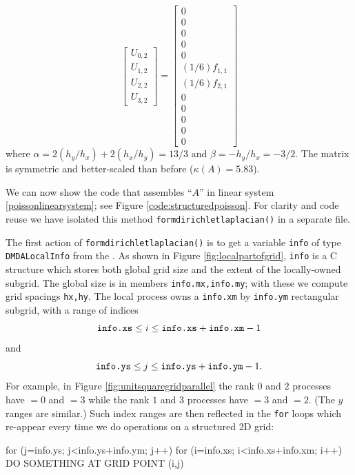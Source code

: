 \begin{example}
\begin{equation*}
\begin{bmatrix}
U_{0,2} \\
U_{1,2} \\
U_{2,2} \\
U_{3,2}
\end{bmatrix}
=
\begin{bmatrix}
0 \\
0 \\
0 \\
0 \\
0 \\
(1/6) f_{1,1} \\
(1/6) f_{2,1} \\
0 \\
0 \\
0 \\
0 \\
0
\end{bmatrix}
\end{equation*}
where $\alpha = 2 (h_y/h_x) + 2 (h_x/h_y) = 13/3$ and $\beta = - h_y/h_x = - 3/2$.  The matrix is symmetric and better-scaled than before ($\kappa(A)=5.83$).
\end{example}
\noindent\hrulefill

We can now show the code that assembles ``$A$'' in linear system \eqref{poissonlinearsystem}; see Figure \ref{code:structuredpoisson}.  For clarity and code reuse we have isolated this method \texttt{formdirichletlaplacian()} in a separate file.


The first action of \texttt{formdirichletlaplacian()} is to get a variable \texttt{info} of type \texttt{DMDALocalInfo} from the \pDM.  As shown in Figure \ref{fig:localpartofgrid}, \texttt{info} is a C structure which stores both global grid size and the extent of the locally-owned subgrid.  The global size is in members \texttt{info.mx,info.my}; with these we compute grid spacings \texttt{hx,hy}.  The local process owns a \texttt{info.xm} by \texttt{info.ym} rectangular subgrid, with a range of indices
   $$\text{\texttt{info.xs}} \le i \le \text{\texttt{info.xs}} +\text{\texttt{info.xm}}-1$$
and
   $$\text{\texttt{info.ys}} \le j \le \text{\texttt{info.ys}} +\text{\texttt{info.ym}}-1.$$
For example, in Figure \ref{fig:unitsquaregridparallel} the rank $0$ and $2$ processes have $=0$ and $=3$ while the rank $1$ and $3$ processes have $=3$ and $=2$.  (The $y$ ranges are similar.)  Such index ranges are then reflected in the \texttt{for} loops which re-appear every time we do operations on a structured 2D grid:
\begin{code}
for (j=info.ys; j<info.ys+info.ym; j++) {
  for (i=info.xs; i<info.xs+info.xm; i++) {
    DO SOMETHING AT GRID POINT (i,j)
  }
}
\end{code}

